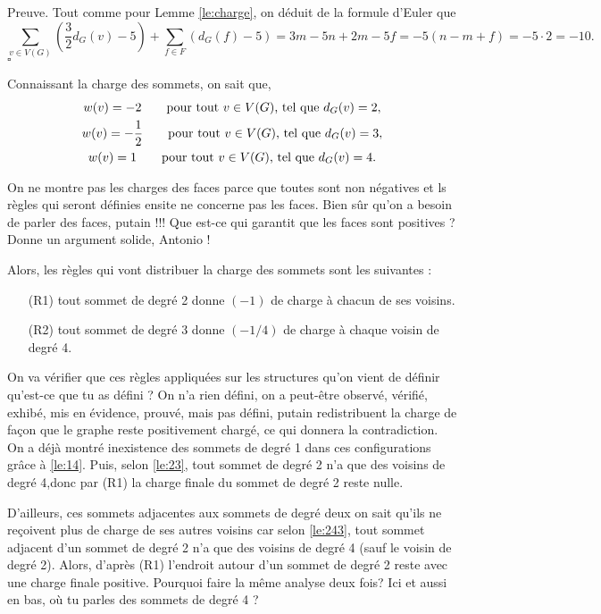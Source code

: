 \documentclass[10pt,a4paper]{article}
\newcommand{\ep}{{\hfill $\square$}}
\begin{document}
Preuve.
Tout comme pour Lemme \ref{le:charge}, on déduit de la formule d'Euler que
$$ 
\sum_{v \in V(G)} \left(\frac{3}{2}d_G(v) - 5\right) + \sum_{f\in F} \left(d_G(f) -5\right) = 3m -5n + 2m - 5f = -5(n - m + f) = -5 \cdot 2 = -10.
$$
\ep 

Connaissant la charge des sommets, on sait que,
$$
\gathered
w(v) = -2 \qquad \textrm{pour tout $v \in V(G)$, tel que } d_G(v) = 2,\\
w(v) = -\frac{1}{2} \qquad \textrm{pour tout $v \in V(G)$, tel que } d_G(v) = 3,\\
w(v) =  1 \qquad \textrm{pour tout $v \in V(G)$, tel que } d_G(v) = 4.
\endgathered
$$

{\color{red} On ne montre pas les charges des faces parce que toutes sont non négatives et ls règles qui seront définies ensite ne concerne pas les faces. }
{\color{blue} Bien sûr qu'on a besoin de parler des faces, putain !!! Que est-ce qui garantit que les faces sont positives ? Donne un argument solide, Antonio !}

Alors, les règles qui vont distribuer la charge des sommets sont les suivantes :

\begin{enumerate}
\item[(R1)] tout sommet de degré 2 donne $(-1)$ de charge à chacun de ses voisins.
\item[(R2)] tout sommet de degré 3 donne $(-1/4)$ de charge à chaque voisin de degré 4.
\end{enumerate}

On va vérifier que ces règles appliquées sur {\color{red} les structures qu'on vient de définir}{\color{blue} qu'est-ce que tu as défini ? On n'a rien défini, on a peut-être observé, vérifié, exhibé, mis en évidence, prouvé, mais pas défini, putain} redistribuent la charge de façon que le graphe reste positivement chargé, ce qui donnera la contradiction. On a déjà montré inexistence des sommets de degré 1 dans ces configurations grâce à \ref{le:14}. Puis, selon \ref{le:23}, tout sommet de degré 2 n'a que des voisins de degré 4,donc par (R1) la charge finale du sommet de degré 2 reste nulle.

D'ailleurs, ces sommets adjacentes aux sommets de degré deux on sait qu'ils ne reçoivent plus de charge de ses autres voisins car selon \ref{le:243}, tout sommet adjacent d'un sommet de degré 2 n'a que des voisins de degré 4 (sauf le voisin de degré 2). Alors, d'après (R1) l'endroit autour d'un sommet de degré 2 reste avec une charge finale positive. {\color{blue} Pourquoi faire la même analyse deux fois? Ici et aussi en bas, où tu parles des sommets de degré 4 ?}
\end{document}
